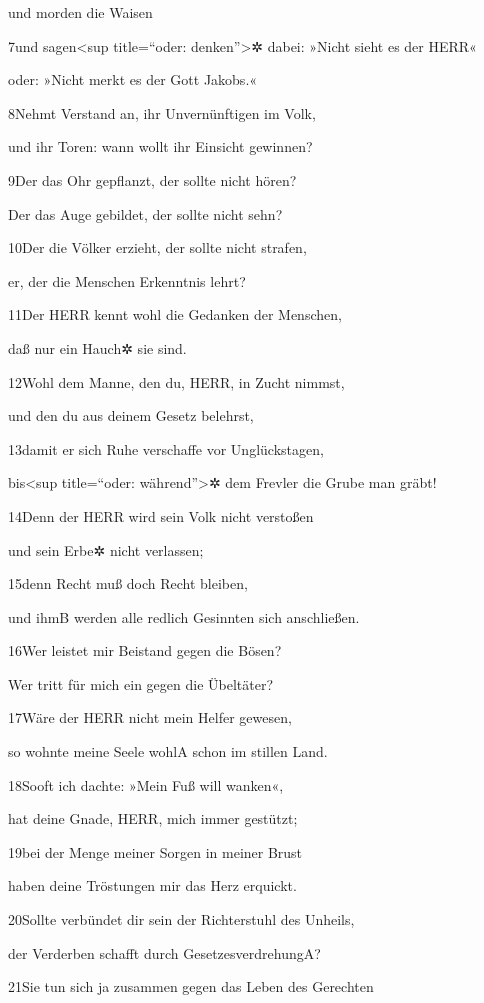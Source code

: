 und morden die Waisen

7und sagen\textless sup title=``oder: denken''\textgreater✲ dabei:
»Nicht sieht es der HERR«

oder: »Nicht merkt es der Gott Jakobs.«

8Nehmt Verstand an, ihr Unvernünftigen im Volk,

und ihr Toren: wann wollt ihr Einsicht gewinnen?

9Der das Ohr gepflanzt, der sollte nicht hören?

Der das Auge gebildet, der sollte nicht sehn?

10Der die Völker erzieht, der sollte nicht strafen,

er, der die Menschen Erkenntnis lehrt?

11Der HERR kennt wohl die Gedanken der Menschen,

daß nur ein Hauch✲ sie sind.

12Wohl dem Manne, den du, HERR, in Zucht nimmst,

und den du aus deinem Gesetz belehrst,

13damit er sich Ruhe verschaffe vor Unglückstagen,

bis\textless sup title=``oder: während''\textgreater✲ dem Frevler die
Grube man gräbt!

14Denn der HERR wird sein Volk nicht verstoßen

und sein Erbe✲ nicht verlassen;

15denn Recht muß doch Recht bleiben,

und ihm{B} werden alle redlich Gesinnten sich anschließen.

16Wer leistet mir Beistand gegen die Bösen?

Wer tritt für mich ein gegen die Übeltäter?

17Wäre der HERR nicht mein Helfer gewesen,

so wohnte meine Seele wohl{A} schon im stillen Land.

18Sooft ich dachte: »Mein Fuß will wanken«,

hat deine Gnade, HERR, mich immer gestützt;

19bei der Menge meiner Sorgen in meiner Brust

haben deine Tröstungen mir das Herz erquickt.

20Sollte verbündet dir sein der Richterstuhl des Unheils,

der Verderben schafft durch Gesetzesverdrehung{A}?

21Sie tun sich ja zusammen gegen das Leben des Gerechten

